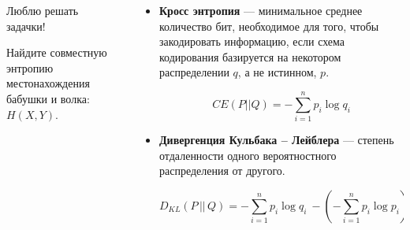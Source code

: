 \documentclass[final]{beamer}
\newlength{\sepwid}
\newlength{\onecolwid}
\newlength{\twocolwid}
\begin{document}
\begin{frame}[t]
\begin{columns}[t]
\begin{column}{\onecolwid}
\begin{alertblock}{Люблю решать задачки!}
\begin{enumerate}
		Найдите совместную энтропию местонахождения бабушки и волка: $H(X, Y)$. 
	\end{enumerate}
    
\end{alertblock}




\end{column} %

\begin{column}{\sepwid}\end{column} %

\begin{column}{\twocolwid} %

\begin{columns}[t,totalwidth=\twocolwid] %

\begin{column}{\onecolwid}\vspace{-.6in} %




\begin{itemize}
	\item \textbf{Кросс энтропия} --- минимальное среднее количество бит, необходимое для того, чтобы закодировать информацию, если схема кодирования базируется на некотором распределении $q$, а не истинном, $p$.
	
	\[CE(P||Q)=-\sum\limits_{i=1}^{n}p_i\log q_i \]
	
	\item \textbf{Дивергенция Кульбака -- Лейблера} --- степень отдаленности одного вероятностного распределения от другого.
	
	\[D_{KL}(P\, ||\, Q)=  - \sum\limits_{i=1}^n p_i\log q_i\ - ( - \sum\limits_{i=1}^n p_i\log p_i)\]
\end{itemize}
	


\end{column}
\end{columns}
\end{column}
\end{columns}
\end{frame}
\end{document}
